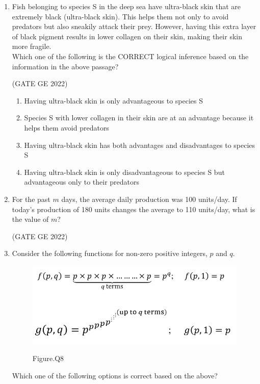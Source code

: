 \documentclass[journal,12pt,onecolumn]{IEEEtran}
\theoremstyle{remark}
\begin{document}
\begin{enumerate}
\item Fish belonging to species S in the deep sea have ultra-black skin that are extremely black (ultra-black skin). This helps them not only to avoid predators but also sneakily attack their prey. However, having this extra layer of black pigment results in lower collagen on their skin, making their skin more fragile. \\
Which one of the following is the CORRECT logical inference based on the information in the above passage?

\hfill (GATE GE 2022)

\begin{enumerate}
    \item Having ultra-black skin is only advantageous to species S
    \item Species S with lower collagen in their skin are at an advantage because it helps them avoid predators
    \item Having ultra-black skin has both advantages and disadvantages to species S
    \item Having ultra-black skin is only disadvantageous to species S but advantageous only to their predators
\end{enumerate}

\item For the past $m$ days, the average daily production was 100 units/day. If today's production of 180 units changes the average to 110 units/day, what is the value of $m$?

\hfill (GATE GE 2022)

\begin{enumerate}
\end{enumerate}

\item Consider the following functions for non-zero positive integers, $p$ and $q$.
\begin{figure}[H]
    \centering
    \includegraphics[width=0.6\columnwidth]{figs/fig_8.png}
    \label{fig:question8}
    \caption*{Figure.Q8}
\end{figure}
Which one of the following options is correct based on the above?


\end{enumerate}
\end{document}
